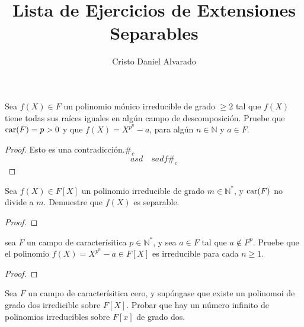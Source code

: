 \documentclass[12pt]{report}
\theoremstyle{largebreak}
\newcommand{\car}[1]{\ensuremath{\textup{car}(#1)}}
\newcommand\contradiction{\ensuremath{\#_c}}
\begin{document}
    \title{Lista de Ejercicios de Extensiones Separables}
    \author{Cristo Daniel Alvarado}
    \maketitle

    
    \setcounter{chapter}{3}
    \setcounter{section}{1}

    \begin{excer}
        Sea $f(X)\in F$ un polinomio mónico irreducible de grado $\geq2$ tal que $f(X)$ tiene todas sus raíces iguales en algún campo de descomposición. Pruebe que $\car{F}=p>0$ y que $f(X)=X^{p^n}-a$, para algún $n\in\mathbb{N}$ y $a\in F$.
    \end{excer}
    
    \begin{proof}
        Esto es una contradicción.\contradiction
        \begin{equation}
            asd\quad sadf\contradiction
        \end{equation}
    \end{proof}

    \begin{excer}
        Sea $f(X)\in F[X]$ un polinomio irreducible de grado $m\in\mathbb{N}^*$, y $\car{F}$ no divide a $m$. Demuestre que $f(X)$ es separable.
    \end{excer}

    \begin{proof}
        
    \end{proof}

    \begin{excer}
        sea $F$ un campo de caracterísitica $p\in\mathbb{N}^*$, y sea $a\in F$ tal que $a\notin F^p$. Pruebe que el polinomio $f(X)=X^{p^n}-a\in F[X]$ es irreducible para cada $n\geq 1$.
    \end{excer}

    \begin{proof}
        
    \end{proof}

    \begin{excer}
        Sea $F$ un campo de caracterísitica cero, y supóngase que existe un polinomoi de grado dos irredicible sobre $F[X]$. Probar que hay un número infinito de polinomios irreducibles sobre $F[x]$ de grado dos.
    \end{excer}
\end{document}
